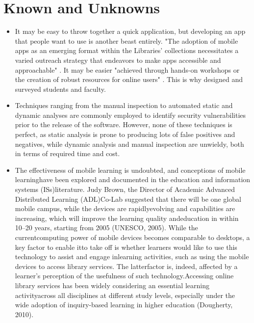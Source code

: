     
   

\section{Known and Unknowns}
    \begin{itemize}
        \item
        It may be easy to throw together a quick application, but developing an app that people want to use is another beast entirely. "The adoption of mobile apps as an emerging format within the Libraries’ collections necessitates a varied outreach strategy that endeavors to make apps accessible and approachable" \cite{saragossi_costello_kasten_2018}. It may be easier "achieved through hands-on workshops or the creation of robust resources for online users" \cite{saragossi_costello_kasten_2018}. This is why designed and surveyed students and faculty.
        
        \item 
        Techniques ranging from the manual inspection to
        automated static and dynamic analyses are commonly employed to
        identify security vulnerabilities prior to the release of the software.
        However, none of these techniques is perfect, as static analysis is
        prone to producing lots of false positives and negatives, while dynamic analysis and manual inspection are unwieldy, both in terms
        of required time and cost. \cite{MiningMobileApp}
        
        \item
        The effectiveness of mobile learning is undoubted, and conceptions of mobile learninghave been explored and documented in the education and information systems (ISs)literature. Judy Brown, the Director of Academic Advanced Distributed Learning (ADL)Co-Lab suggested that there will be one global mobile campus, while the devices are rapidlyevolving and capabilities are increasing, which will improve the learning quality andeducation in within 10–20 years, starting from 2005 (UNESCO, 2005). While the currentcomputing power of mobile devices becomes comparable to desktops, a key factor to enable itto take off is whether learners would like to use this technology to assist and engage inlearning activities, such as using the mobile devices to access library services. The latterfactor is, indeed, affected by a learner’s perception of the usefulness of such technology.Accessing online library services has been widely considering an essential learning activityacross all disciplines at different study levels, especially under the wide adoption of inquiry-based learning in higher education (Dougherty, 2010). \cite{Mobile_Apps_Between_Hong_Kong_and_Japan}
        

\end{itemize}
